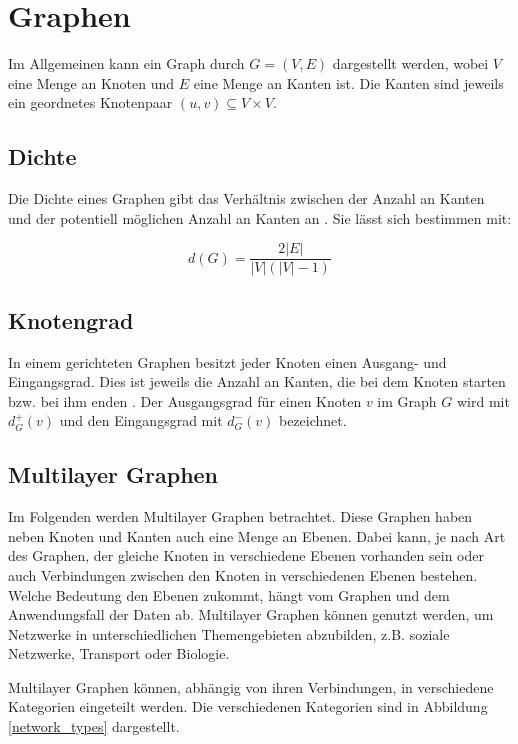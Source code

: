 \section{Graphen}


Im Allgemeinen kann ein Graph durch $G = (V, E)$ dargestellt werden, wobei $V$ eine Menge an Knoten und $E$ eine Menge an Kanten ist. Die Kanten sind jeweils ein geordnetes Knotenpaar $(u, v) \subseteq V \times V$.

\subsection{Dichte}
\label{dichte}

Die Dichte eines Graphen gibt das Verhältnis zwischen der Anzahl an Kanten und der potentiell möglichen Anzahl an Kanten an \cite{diestel2010graphentheorie}.
Sie lässt sich bestimmen mit:

\[ d(G) =  \frac{2|{E}|}{|V|(|V| - 1)}    \]


\subsection{Knotengrad}
\label{knotengrad}

In einem gerichteten Graphen besitzt jeder Knoten einen Ausgang- und Eingangsgrad. Dies ist jeweils die Anzahl an Kanten, die bei dem Knoten starten bzw. bei ihm enden \cite{diestel2010graphentheorie}.
Der Ausgangsgrad für einen Knoten $v$ im Graph $G$ wird mit $d^{+}_{G}(v)$ und den Eingangsgrad mit $d^{-}_{G}(v)$ bezeichnet.


\subsection{Multilayer Graphen}

Im Folgenden werden Multilayer Graphen betrachtet. Diese Graphen haben neben Knoten und Kanten auch eine Menge an Ebenen. Dabei kann, je nach Art des Graphen, der gleiche Knoten in verschiedene Ebenen vorhanden sein oder auch Verbindungen zwischen den Knoten in verschiedenen Ebenen bestehen.
Welche Bedeutung den Ebenen zukommt, hängt vom Graphen und dem Anwendungsfall der Daten ab. Multilayer Graphen können genutzt werden, um Netzwerke in unterschiedlichen Themengebieten abzubilden, z.B. soziale Netzwerke, Transport oder Biologie.

Multilayer Graphen können, abhängig von ihren Verbindungen, in verschiedene Kategorien eingeteilt werden. Die verschiedenen Kategorien sind in Abbildung \ref{network_types} dargestellt. 


